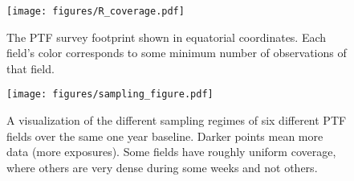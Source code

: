 \documentclass[12pt,preprint]{aastex}
\begin{document}
\clearpage
\setlength{\baselineskip}{0.6\baselineskip}

\setlength{\baselineskip}{1.667\baselineskip}


%
%

\begin{figure}
	\centering
	\caption{The PTF survey footprint shown in equatorial coordinates. Each field's color corresponds to some minimum number of observations of that field. }
    \texttt{[image: figures/R\_coverage.pdf]}
    \label{fig:survey_footprint}
\end{figure}	

\begin{figure}
	\centering
	\caption{A visualization of the different sampling regimes of six different PTF fields over the same one year baseline. Darker points mean more data (more exposures). Some fields have roughly uniform coverage, where others are very dense during some weeks and not others. }
    \texttt{[image: figures/sampling\_figure.pdf]}
    \label{fig:sampling}
\end{figure}
%
%
\end{document}
